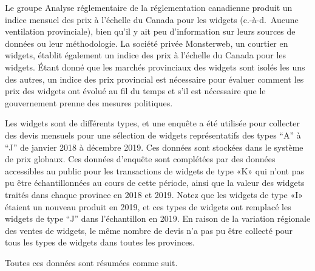 \documentclass[]{article}
\begin{document}
Le groupe Analyse réglementaire de la réglementation canadienne produit un indice mensuel des prix à l'échelle du Canada pour les widgets (c.-à-d.~Aucune ventilation provinciale), bien qu'il y ait peu d'information sur leurs sources de données ou leur méthodologie. La société privée Monsterweb, un courtier en widgets, établit également un indice des prix à l'échelle du Canada pour les widgets. Étant donné que les marchés provinciaux des widgets sont isolés les uns des autres, un indice des prix provincial est nécessaire pour évaluer comment les prix des widgets ont évolué au fil du temps et s'il est nécessaire que le gouvernement prenne des mesures politiques.

Les widgets sont de différents types, et une enquête a été utilisée pour collecter des devis mensuels pour une sélection de widgets représentatifs des types ``A'' à ``J'' de janvier 2018 à décembre 2019. Ces données sont stockées dans le système de prix globaux. Ces données d'enquête sont complétées par des données accessibles au public pour les transactions de widgets de type «K» qui n'ont pas pu être échantillonnées au cours de cette période, ainsi que la valeur des widgets traités dans chaque province en 2018 et 2019. Notez que les widgets de type «I» étaient un nouveau produit en 2019, et ces types de widgets ont remplacé les widgets de type ``J'' dans l'échantillon en 2019. En raison de la variation régionale des ventes de widgets, le même nombre de devis n'a pas pu être collecté pour tous les types de widgets dans toutes les provinces.

Toutes ces données sont résumées comme suit.
\end{document}

